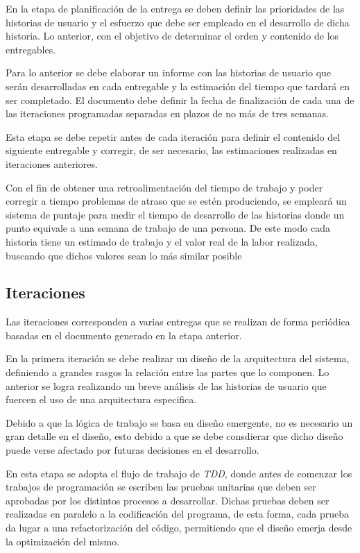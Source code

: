 En la etapa de planificación de la entrega se deben definir las prioridades de las historias de usuario y el esfuerzo que debe ser empleado en el desarrollo de dicha historia. Lo anterior, con el objetivo de determinar el orden y contenido de los entregables.

Para lo anterior se debe elaborar un informe con las historias de usuario que serán desarrolladas en cada entregable y la estimación del tiempo que tardará en ser completado. El documento debe definir la fecha de finalización de cada una de las iteraciones programadas separadas en plazos de no más de tres semanas. 

Esta etapa se debe repetir antes de cada iteración para definir el contenido del siguiente entregable y corregir, de ser necesario, las estimaciones realizadas en iteraciones anteriores.

Con el fin de obtener una retroalimentación del tiempo de trabajo y poder corregir a tiempo problemas de atraso que se estén produciendo, se empleará un sistema de puntaje para medir el tiempo de desarrollo de las historias donde un punto equivale a una semana de trabajo de una persona. De este modo cada historia tiene un estimado de trabajo y el valor real de la labor realizada, buscando que dichos valores sean lo más similar posible

\subsection{Iteraciones}

Las iteraciones corresponden a varias entregas que se realizan de forma periódica basadas en el documento generado en la etapa anterior.

En la primera iteración se debe realizar un diseño de la arquitectura del sistema, definiendo a grandes rasgos la relación entre las partes que lo componen. Lo anterior se logra realizando un breve análisis de las historias de usuario que fuercen el uso de una arquitectura especifica. 

Debido a que la lógica de trabajo se basa en diseño emergente, no es necesario un gran detalle en el diseño, esto debido a que se debe consdierar que dicho diseño puede verse afectado por futuras decisiones en el desarrollo.

En esta etapa se adopta el flujo de trabajo de \textit{TDD}, donde antes de comenzar los trabajos de programación se escriben las pruebas unitarias que deben ser aprobadas por los distintos procesos a desarrollar. Dichas pruebas deben ser realizadas en paralelo a la codificación del programa, de esta forma, cada prueba da lugar a una refactorización del código, permitiendo que el diseño emerja desde la optimización del mismo.

